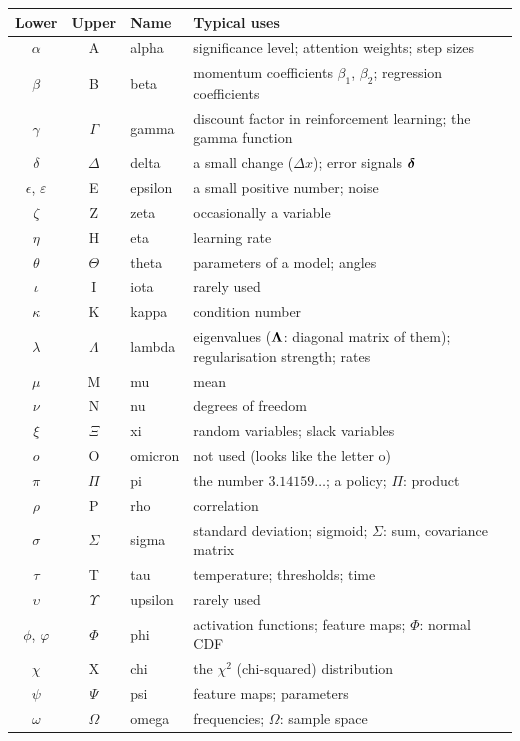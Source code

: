 \begin{center}
\renewcommand{\arraystretch}{1.2}
\begin{tabular}{@{}cclp{8.4cm}@{}}
\toprule
\textbf{Lower} & \textbf{Upper} & \textbf{Name} & \textbf{Typical uses}\\
\midrule
$\alpha$ & A & alpha & significance level; attention weights; step sizes\\
$\beta$ & B & beta & momentum coefficients $\beta_1$, $\beta_2$; regression coefficients\\
$\gamma$ & $\Gamma$ & gamma & discount factor in reinforcement learning; the gamma function\\
$\delta$ & $\Delta$ & delta & a small change ($\Delta x$); error signals $\bm{\delta}$\\
$\epsilon$, $\varepsilon$ & E & epsilon & a small positive number; noise\\
$\zeta$ & Z & zeta & occasionally a variable\\
$\eta$ & H & eta & learning rate\\
$\theta$ & $\Theta$ & theta & parameters of a model; angles\\
$\iota$ & I & iota & rarely used\\
$\kappa$ & K & kappa & condition number\\
$\lambda$ & $\Lambda$ & lambda & eigenvalues ($\bm{\Lambda}$: diagonal matrix of them); regularisation strength; rates\\
$\mu$ & M & mu & mean\\
$\nu$ & N & nu & degrees of freedom\\
$\xi$ & $\Xi$ & xi & random variables; slack variables\\
$o$ & O & omicron & not used (looks like the letter o)\\
$\pi$ & $\Pi$ & pi & the number $3.14159\ldots$; a policy; $\Pi$: product\\
$\rho$ & P & rho & correlation\\
$\sigma$ & $\Sigma$ & sigma & standard deviation; sigmoid; $\Sigma$: sum, covariance matrix\\
$\tau$ & T & tau & temperature; thresholds; time\\
$\upsilon$ & $\Upsilon$ & upsilon & rarely used\\
$\phi$, $\varphi$ & $\Phi$ & phi & activation functions; feature maps; $\Phi$: normal CDF\\
$\chi$ & X & chi & the $\chi^2$ (chi-squared) distribution\\
$\psi$ & $\Psi$ & psi & feature maps; parameters\\
$\omega$ & $\Omega$ & omega & frequencies; $\Omega$: sample space\\
\bottomrule
\end{tabular}
\end{center}
